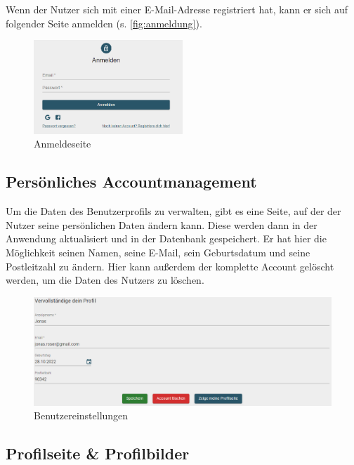 Wenn der Nutzer sich mit einer E-Mail-Adresse registriert hat, kann er sich auf folgender Seite anmelden (s. \autoref{fig:anmeldung}).

\begin{figure}[htb]
  \centering
  \includegraphics[width=0.5\textwidth]{figures/boas/21_anmelden.png}
  \caption[]{Anmeldeseite}
  \label{fig:anmeldung}
\end{figure}

\clearpage

\subsection{Persönliches Accountmanagement}
\label{sec:accountmanagement}

Um die Daten des Benutzerprofils zu verwalten, gibt es eine Seite, auf der der Nutzer seine persönlichen Daten ändern kann.
Diese werden dann in der Anwendung aktualisiert und in der Datenbank gespeichert. Er hat hier die Möglichkeit seinen Namen, seine E-Mail, sein Geburtsdatum und seine Postleitzahl zu ändern.
Hier kann außerdem der komplette Account gelöscht werden, um die Daten des Nutzers zu löschen.

\begin{figure}[ht!]
  \begin{centering}
    \includegraphics[width=1\textwidth]{figures/implementation/userSettings.png}
    \caption{Benutzereinstellungen}
    \label{fig:userSettings}
  \end{centering}
\end{figure}

\subsection{Profilseite \& Profilbilder}
\label{sec:profilepictures}

